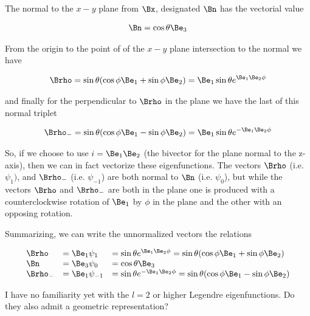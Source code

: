 The normal to the $x-y$ plane from $\Bx$, designated $\Bn$ has the vectorial value

\begin{align}\label{eqn:foo3}
\Bn = \cos\theta \Be_3 
\end{align}

From the origin to the point of of the $x-y$ plane intersection to the normal we have

\begin{align}\label{eqn:foo4}
\Brho = \sin\theta (\cos\phi \Be_1 + \sin\phi \Be_2) = \Be_1 \sin\theta e^{\Be_1 \Be_2 \phi}
\end{align}

and finally for the perpendicular to $\Brho$ in the plane we have the last of this normal triplet

\begin{align}\label{eqn:foo5}
\Brho_{-} = \sin\theta (\cos\phi \Be_1 - \sin\phi \Be_2) = \Be_1 \sin\theta e^{-\Be_1 \Be_2 \phi}
\end{align}

So, if we choose to use $i=\Be_1 \Be_2$ (the bivector for the plane normal to the z-axis), then we can in fact vectorize these eigenfunctions.  The vectors $\Brho$ (i.e. $\psi_1)$, and $\Brho_{-}$ (i.e. $\psi_{-1}$) are both normal to $\Bn$ (i.e. $\psi_0$), but while the vectors $\Brho$ and $\Brho_{-}$ are both in the plane one is produced with a counterclockwise rotation of $\Be_1$ by $\phi$ in the plane and the other with an opposing rotation.

Summarizing, we can write the unnormalized vectors the relations

\begin{equation*}\label{eqn:foo7}
\begin{array}{l l l}
\Brho &= \Be_1 \psi_1 &= \sin\theta e^{\Be_1\Be_2 \phi} = \sin\theta (\cos\phi \Be_1 + \sin\phi \Be_2) \\
\Bn &= \Be_3 \psi_0 &= \cos\theta \Be_3 \\
\Brho_{-} &= \Be_1 \psi_{-1} &= \sin\theta e^{-\Be_1\Be_2 \phi} = \sin\theta (\cos\phi \Be_1 - \sin\phi \Be_2)
\end{array}
\end{equation*}

I have no familiarity yet with the $l=2$ or higher Legendre eigenfunctions.  Do they also admit a geometric representation?

\EndArticle
